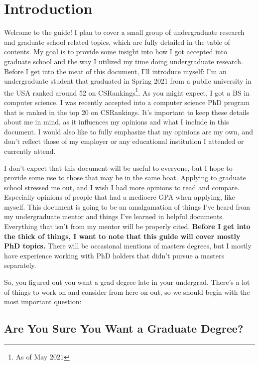 \documentclass[12pt]{article}
\begin{document}


\begingroup
\hypersetup{linkcolor=black}
\tableofcontents
\pagebreak
\endgroup

\section{Introduction}

Welcome to the guide! I plan to cover a small group of undergraduate research and graduate school related topics, which are fully detailed in the table of contents. My goal is to provide some insight into how I got accepted into graduate school and the way I utilized my time doing undergraduate research. Before I get into the meat of this document, I’ll introduce myself: I’m an undergraduate student that graduated in Spring 2021 from a public university in the USA ranked around 52 on CSRankings\footnote{As of May 2021}. As you might expect, I got a BS in computer science. I was recently accepted into a computer science PhD program that is ranked in the top 20 on CSRankings. It’s important to keep these details about me in mind, as it influences my opinions and what I include in this document. I would also like to fully emphasize that my opinions are my own, and don’t reflect those of my employer or any educational institution I attended or currently attend. 

I don’t expect that this document will be useful to everyone, but I hope to provide some use to those that may be in the same boat. Applying to graduate school stressed me out, and I wish I had more opinions to read and compare. Especially opinions of people that had a mediocre GPA when applying, like myself. This document is going to be an amalgamation of things I've heard from my undergraduate mentor and things I've learned in helpful documents. Everything that isn't from my mentor will be properly cited. \textbf{Before I get into the thick of things, I want to note that this guide will cover mostly PhD topics.} There will be occasional mentions of masters degrees, but I mostly have experience working with PhD holders that didn't pursue a masters separately.

So, you figured out you want a grad degree late in your undergrad. There’s a lot of things to work on and consider from here on out, so we should begin with the most important question:

\subsection{Are You Sure You Want a Graduate Degree?}
\end{document}
